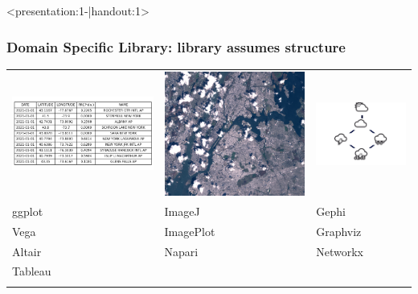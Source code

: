 \documentclass[xcolor={dvipsnames}]{beamer}
\begin{document}
\begin{frame}<presentation:1-|handout:1>
    \frametitle{Domain Specific Library: library assumes structure \cite{HeerSoftware2006}}
    \begin{table}
        \begin{tabular}{>{\onslide<1->}l>{\onslide<2->}l>{\onslide<3->}l}
            \includegraphics[width=.24\textwidth]{figures/intro/table.png} & \includegraphics[width=.3\textwidth]{figures/intro/landsat.png} & \includegraphics[width=.33\textwidth]{figures/math/graph.png} \\
            ggplot\cite{wickhamGgplot2ElegantGraphics2016a}  & ImageJ\cite{schneiderNIHImageImageJ2012}& Gephi\cite{bastianGephiOpenSource2009}\\
            Vega\cite{satyanarayanDeclarativeInteractionDesign2014} & ImagePlot\cite{studiesCulturevisImageplot2021} & Graphviz\cite{ellsonGraphvizOpenSource2002}\\
            Altair\cite{vanderplasAltairInteractiveStatistical2018}& Napari\cite{nicholas_sofroniew_2021_4533308} & Networkx\cite{HagbergExploringNetwork2008}\\
             Tableau \cite{StoltePolaris2002}& &\\
            \cite{hanrahanVizQL2006,MackinlayShowme2007}&&\\        
        \end{tabular}
    \end{table}
\end{frame}
\end{document}
